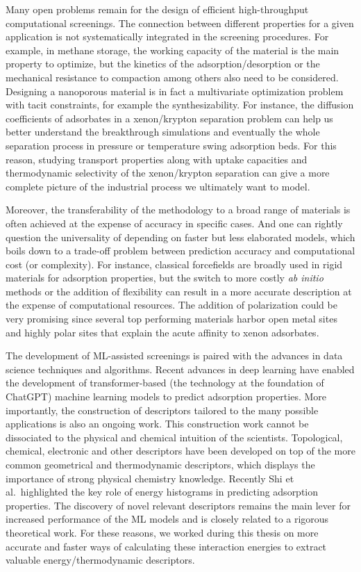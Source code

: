 \documentclass[main.tex]{subfiles}
\begin{document}
Many open problems remain for the design of efficient high-throughput computational screenings. The connection between different properties for a given application is not systematically integrated in the screening procedures. For example, in methane storage, the working capacity of the material is the main property to optimize, but the kinetics of the adsorption/desorption or the mechanical resistance to compaction among others also need to be considered. Designing a nanoporous material is in fact a multivariate optimization problem with tacit constraints, for example the {synthesizability}. For instance, the diffusion coefficients of adsorbates in a xenon/krypton separation problem can help us better understand the breakthrough simulations and eventually the whole separation process in pressure or temperature swing adsorption beds. For this reason, studying transport properties along with uptake capacities and thermodynamic selectivity of the xenon/krypton separation can give a more complete picture of the industrial process we ultimately want to model. 

Moreover, the transferability of the methodology to a broad range of materials is often achieved at the expense of accuracy in specific cases. And one can rightly question the universality of depending on faster but less elaborated models, which boils down to a trade-off problem between prediction accuracy and computational cost (or complexity). For instance, classical forcefields are broadly used in rigid materials for adsorption properties, but the switch to more costly \emph{ab initio} methods or the addition of flexibility can result in a more accurate description at the expense of computational resources. The addition of polarization could be very promising since several top performing materials harbor open metal sites and highly polar sites that explain the acute affinity to xenon adsorbates. 

The development of ML-assisted screenings is paired with the advances in data science techniques and algorithms. Recent advances in deep learning have enabled the development of transformer-based (the technology at the foundation of ChatGPT) machine learning models to predict adsorption properties.\cite{Kang_2023,Cao_2023} More importantly, the construction of descriptors tailored to the many possible applications is also an ongoing work. This construction work cannot be dissociated to the physical and chemical intuition of the scientists. Topological, chemical, electronic and other descriptors have been developed on top of the more common geometrical and thermodynamic descriptors, which displays the importance of strong physical chemistry knowledge. Recently Shi et al.\ highlighted the key role of energy histograms in predicting adsorption properties.\cite{Shi_2023}
The discovery of novel relevant descriptors remains the main lever for increased performance of the ML models and is closely related to a rigorous theoretical work.
For these reasons, we worked during this thesis on more accurate and faster ways of calculating these interaction energies to extract valuable energy/thermodynamic descriptors.
\end{document}
